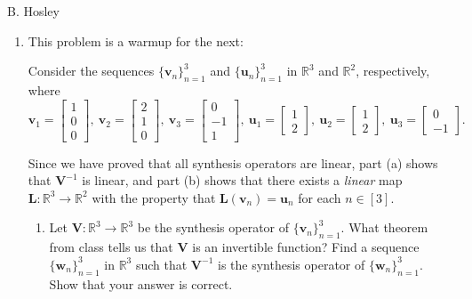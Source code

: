 \documentclass[12pt]{amsart}
\newcommand{\1}{\mathbbm{1}}
\numberwithin{equation}{section}
\numberwithin{Theorem}{section}
\theoremstyle{plain} %
\theoremstyle{definition}
\theoremstyle{remark}
\begin{document}
\thispagestyle{empty}

\hspace{\fill} {\Large B. Hosley}
\bigskip


\begin{enumerate}[1.]

\item This problem is a warmup for the next:

Consider the sequences \(\{\mathbf{v}_{n}\}_{n=1}^{3}\) and \(\{\mathbf{u}_{n}\}_{n=1}^{3}\) in \(\mathbb{R}^{3}\) and \(\mathbb{R}^{2}\), respectively, where
\[\mathbf{v}_{1} = \begin{bmatrix} 1\\ 0\\ 0\end{bmatrix},\ \mathbf{v}_{2} = \begin{bmatrix} 2\\ 1\\ 0\end{bmatrix},\ \mathbf{v}_{3} = \begin{bmatrix} 0\\ -1\\ 1\end{bmatrix},\ \mathbf{u}_{1} = \begin{bmatrix} 1\\ 2\end{bmatrix},\ \mathbf{u}_{2} = \begin{bmatrix} 1\\ 2\end{bmatrix},\ \mathbf{u}_{3} = \begin{bmatrix} 0\\ -1\end{bmatrix}.\]

Since we have proved that all synthesis operators are linear, part (a) shows that \(\mathbf{V}^{-1}\) is linear, and part (b) shows that there exists a \textit{linear} map \(\mathbf{L}:\mathbb{R}^{3}\to\mathbb{R}^{2}\) with the property that \(\mathbf{L}(\mathbf{v}_{n}) = \mathbf{u}_{n}\) for each \(n\in[3]\).

\begin{enumerate}

\item Let \(\mathbf{V}:\mathbb{R}^{3}\to\mathbb{R}^{3}\) be the synthesis operator of \(\{\mathbf{v}_{n}\}_{n=1}^{3}\). What theorem from class tells us that \(\mathbf{V}\) is an invertible function? Find a sequence \(\{\mathbf{w}_{n}\}_{n=1}^{3}\) in \(\mathbb{R}^{3}\) such that \(\mathbf{V}^{-1}\) is the synthesis operator of \(\{\mathbf{w}_{n}\}_{n=1}^{3}\). Show that your answer is correct.


\end{enumerate}
\end{enumerate}
\end{document}
